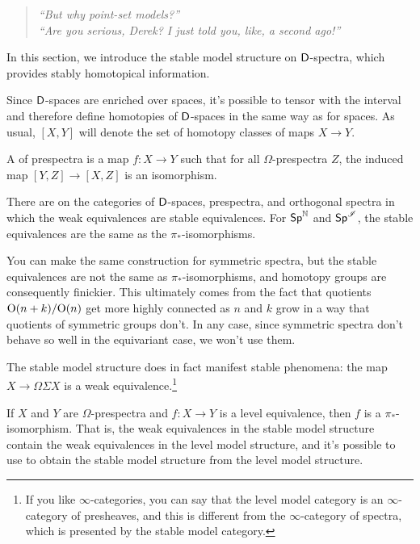 \begin{quote}\textit{
	``But why point-set models?''\\
	``Are you serious, Derek? I just told you, like, a second ago!''
}\end{quote}
\label{monads}
In this section, we introduce the stable model structure on $\mathsf D$-spectra, which provides stably homotopical
information.

Since $\mathsf D$-spaces are enriched over spaces, it's possible to tensor with the interval and therefore define
homotopies of $\mathsf D$-spaces in the same way as for spaces. As usual, $[X,Y]$ will denote the set of homotopy classes
of maps $X\to Y$.
\begin{defn}
\label{stable_equivalence}
A  of prespectra is a map $f\colon X\to Y$ such that for all $\Omega$-prespectra $Z$, the
induced map $[Y,Z]\to[X,Z]$ is an isomorphism.
\end{defn}
\begin{thm}
There are  on the categories of $\mathsf D$-spaces, prespectra, and orthogonal spectra in
which the weak equivalences are stable equivalences. For $\mathsf{Sp}^\mathbb N$ and $\mathsf{Sp}^\mathscr I$, the stable equivalences are the
same as the $\pi_*$-isomorphisms.
\end{thm}
\begin{rem}
You can make the same construction for symmetric spectra, but the stable equivalences are not the same as
$\pi_*$-isomorphisms, and homotopy groups are consequently finickier. This ultimately comes from the fact that
quotients $\mathrm O(n+k)/\mathrm O(n)$ get more highly connected as $n$ and $k$ grow in a way that quotients of symmetric groups
don't. In any case, since symmetric spectra don't behave so well in the equivariant case, we won't use them.
\end{rem}
The stable model structure does in fact manifest stable phenomena: the map $X\to\Omega\Sigma X$ is a weak
equivalence.\footnote{If you like $\infty$-categories, you can say that the level model category is an
$\infty$-category of presheaves, and this is different from the $\infty$-category of spectra, which is presented by
the stable model category.}

If $X$ and $Y$ are $\Omega$-prespectra and $f\colon X\to Y$ is a level equivalence, then $f$ is a
$\pi_*$-isomorphism. That is, the weak equivalences in the stable model structure contain the weak equivalences in
the level model structure, and it's possible to use  to obtain the stable model
structure from the level model structure.

